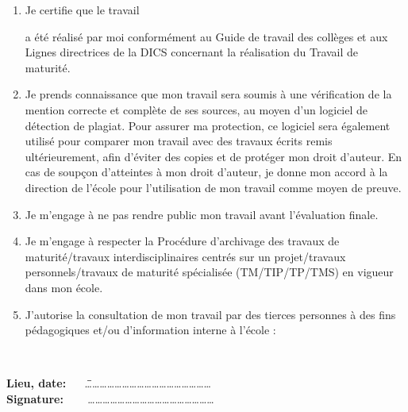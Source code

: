 \documentclass[a4,10pt,french]{sphinxmanual}
\begin{document}
\begin{normalsize}
\begin{enumerate}
%
\item {} 
\sphinxAtStartPar
Je certifie que le travail

{\large \textbf{\tmtitle} }

\sphinxAtStartPar
a été réalisé par moi conformément au Guide de travail des collèges et aux
Lignes directrices de la DICS concernant la réalisation du Travail de
maturité.

\item {} 
\sphinxAtStartPar
Je prends connaissance que mon travail sera soumis à une vérification de la
mention correcte et complète de ses sources, au moyen d’un logiciel de
détection de plagiat. Pour assurer ma protection, ce logiciel sera également
utilisé pour comparer mon travail avec des travaux écrits remis
ultérieurement, afin d’éviter des copies et de protéger mon droit d’auteur.
En cas de soupçon d’atteintes à mon droit d’auteur, je donne mon accord à la
direction de l’école pour l’utilisation de mon travail comme moyen de
preuve.

\item {} 
\sphinxAtStartPar
Je m’engage à ne pas rendre public mon travail avant l’évaluation finale.

\item {} 
\sphinxAtStartPar
Je m’engage à respecter la Procédure d’archivage des travaux de
maturité/travaux interdisciplinaires centrés sur un projet/travaux
personnels/travaux de maturité spécialisée (TM/TIP/TP/TMS) en vigueur dans
mon école.

\item {} 
\sphinxAtStartPar
J’autorise la consultation de mon travail par des tierces personnes à des
fins pédagogiques et/ou d’information interne à l’école :

{
\square \quad {} \\
\square \quad {}
}

\end{enumerate}

{
\large
\begin{tabbing}
\textbf{Lieu, date:} ~~ \=  \= \ldots\ldots\ldots\ldots\ldots\ldots\ldots\ldots\ldots\ldots\ldots\ldots\ldots\ldots\ldots\ldots\ldots \\
\textbf{Signature:} ~~~ \>  \> \ldots\ldots\ldots\ldots\ldots\ldots\ldots\ldots\ldots\ldots\ldots\ldots\ldots\ldots\ldots\ldots\ldots
\end{tabbing} 
}


\end{normalsize}
\end{document}
